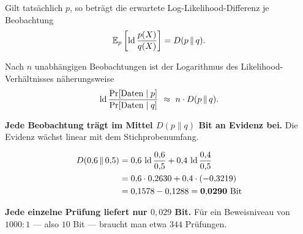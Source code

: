 \begin{merksatz}
Gilt tatsächlich $p$, so beträgt die erwartete Log-Likelihood-Differenz je Beobachtung
\[ \mathbb{E}_p\left[\operatorname{ld}\frac{p(X)}{q(X)}\right] = D(p\,\|\,q) . \]

Nach $n$ unabhängigen Beobachtungen ist der Logarithmus des Likelihood-Verhältnisses näherungsweise
\[ \operatorname{ld}\frac{\Pr[\text{Daten}\mid p]}{\Pr[\text{Daten}\mid q]} \ \approx\ n\cdot D(p\,\|\,q) . \]

\begin{center}
\begin{minipage}{0.9\textwidth}
\textbf{Jede Beobachtung trägt im Mittel $D(p\|q)$ Bit an Evidenz bei.} Die Evidenz wächst linear mit dem Stichprobenumfang.
\end{minipage}
\end{center}

\begin{align*}
D(0{,}6\,\|\,0{,}5) &= 0{,}6\,\operatorname{ld}\frac{0{,}6}{0{,}5} + 0{,}4\,\operatorname{ld}\frac{0{,}4}{0{,}5}\\
&= 0{,}6\cdot0{,}2630 + 0{,}4\cdot(-0{,}3219)\\
&= 0{,}1578 - 0{,}1288 = \mathbf{0{,}0290} \ \text{Bit}
\end{align*}

\begin{center}
\begin{minipage}{0.9\textwidth}
\textbf{Jede einzelne Prüfung liefert nur $0{,}029$ Bit.} Für ein Beweisniveau von $1000{:}1$ --- also $10$ Bit --- braucht man etwa $344$ Prüfungen.
\end{minipage}
\end{center}

\begin{center}
\begin{minipage}{0.88\textwidth}
\end{minipage}
\end{center}
\end{merksatz}

